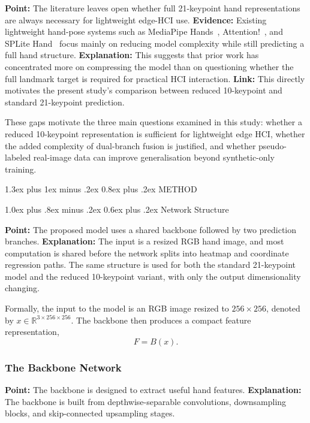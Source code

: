 \documentclass[10pt,letterpaper]{article}
\makeatletter
\renewcommand\section{\@startsection{section}{1}{\z@}%
  {1.3ex plus 1ex minus .2ex}%
  {0.8ex plus .2ex}%
  {\centering\normalfont\small\scshape}}
\renewcommand\subsection{\@startsection{subsection}{2}{\z@}%
  {1.0ex plus .8ex minus .2ex}%
  {0.6ex plus .2ex}%
  {\normalfont\itshape}}
\makeatother
\begin{document}
\medskip
\noindent\textbf{Point:} The literature leaves open whether full 21-keypoint hand representations are always necessary for lightweight edge-HCI use.  
\textbf{Evidence:} Existing lightweight hand-pose systems such as MediaPipe Hands~\cite{mediapipe}, Attention!~\cite{attentionlite}, and SPLite Hand~\cite{splitehand} focus mainly on reducing model complexity while still predicting a full hand structure.  
\textbf{Explanation:} This suggests that prior work has concentrated more on compressing the model than on questioning whether the full landmark target is required for practical HCI interaction.  
\textbf{Link:} This directly motivates the present study's comparison between reduced 10-keypoint and standard 21-keypoint prediction.

\medskip
These gaps motivate the three main questions examined in this study: whether a reduced 10-keypoint representation is sufficient for lightweight edge HCI, whether the added complexity of dual-branch fusion is justified, and whether pseudo-labeled real-image data can improve generalisation beyond synthetic-only training.


\section{METHOD}

\subsection{Network Structure}

\noindent\textbf{Point:} The proposed model uses a shared backbone followed by two prediction branches.  
\textbf{Explanation:} The input is a resized RGB hand image, and most computation is shared before the network splits into heatmap and coordinate regression paths. The same structure is used for both the standard 21-keypoint model and the reduced 10-keypoint variant, with only the output dimensionality changing.

Formally, the input to the model is an RGB image resized to $256 \times 256$, denoted by $x \in \mathbb{R}^{3 \times 256 \times 256}$. The backbone then produces a compact feature representation,
\[
F = B(x).
\]

\subsubsection{The Backbone Network}

\noindent\textbf{Point:} The backbone is designed to extract useful hand features.  
\textbf{Explanation:} The backbone is built from depthwise-separable convolutions, downsampling blocks, and skip-connected upsampling stages.
\end{document}
